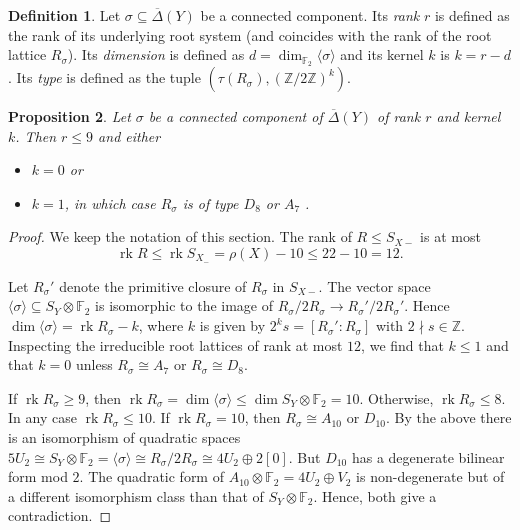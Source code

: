 \documentclass[a4paper]{amsart}
\theoremstyle{definition}
\newtheorem{definition}{Definition}[section]
\theoremstyle{plain}
\newtheorem{proposition}[definition]{Proposition}
\DeclareMathOperator{\rk}{rk}
\newcommand{\FF}{\mathbb{F}}
\newcommand{\ZZ}{\mathbb{Z}}
\newcommand{\DeltabarY}{\overline{\Delta}(Y)}
\begin{document}
\begin{definition}\label{def:rank_type_sigma}
Let $\sigma \subseteq \DeltabarY$ be a connected component. 
Its \emph{rank} $r$ is defined as the rank of its underlying root system (and coincides with the rank of the root lattice $R_\sigma$). Its \emph{dimension} is
defined as $d=\dim_{\FF_2} \langle \sigma \rangle$ and its kernel $k$ is $k=r-d$.
Its \emph{type} is defined as the tuple $(\tau(R_\sigma),(\ZZ/2\ZZ)^k)$. 
\end{definition}

\begin{proposition}\label{prop:connected_comp_delta}
Let $\sigma$ be a connected component of $\DeltabarY$ of rank $r$ and kernel $k$. 
Then $r\leq 9$ and either 
\begin{itemize} 
\item $k=0$ or 
\item $k=1$, in which case $R_\sigma$ is of type $D_8$ or $A_7$ . 
\end{itemize}

\end{proposition}
\begin{proof}
We keep the notation of this section.
The rank of $R\leq S_{X-}$ is at most 
\[\rk R \leq \rk S_{X_-}=\rho(X) - 10 \leq 22-10=12.\] 

Let $R_\sigma'$ denote the primitive closure of $R_\sigma$ in $S_{X-}$. The vector space $\langle \sigma \rangle \subseteq S_Y\otimes \FF_2$ is isomorphic to the image of $R_\sigma/2R_\sigma \to R_\sigma'/2R_\sigma'$. Hence $\dim \langle \sigma \rangle = \rk R_\sigma - k$,
where $k$ is given by $2^ks = [R_\sigma':R_\sigma]$ with $2\nmid s \in \ZZ$. Inspecting the irreducible root lattices of rank at most $12$, we find that $k\leq 1$ and that $k=0$ unless $R_\sigma \cong A_7$ or $R_\sigma\cong D_8$.

If $\rk R_{\sigma} \geq 9$, then $\rk R_\sigma = \dim \langle \sigma \rangle \leq \dim S_Y \otimes \FF_2 = 10$. Otherwise, $\rk R_\sigma \leq 8$.
In any case $\rk R_\sigma \leq 10$. If $\rk R_\sigma = 10$, then $R_\sigma \cong A_{10}$ or $D_{10}$. By the above there is an isomorphism of quadratic spaces $5U_2 \cong S_Y\otimes \FF_2 = \langle \sigma \rangle \cong R_\sigma/2R_\sigma \cong 4U_2\oplus 2[0]$. But $D_{10}$ has a degenerate bilinear form mod $2$. The quadratic form of $A_{10}\otimes \FF_2=4U_2 \oplus V_2$ is non-degenerate but of a different isomorphism class than that of $S_Y\otimes \FF_2$. Hence, both give a contradiction.
\end{proof}
\end{document}
